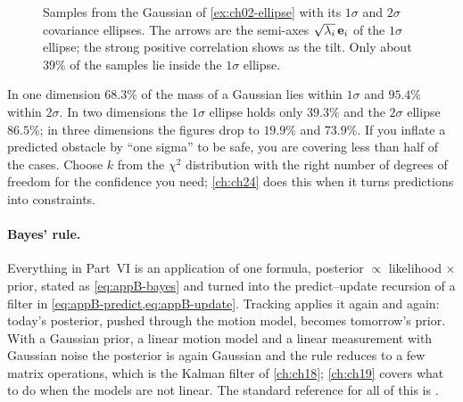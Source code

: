 
\begin{figure}[tb]
  \centering
  \caption{Samples from the Gaussian of \cref{ex:ch02-ellipse} with its $1\sigma$ and $2\sigma$ covariance ellipses. The arrows are the semi-axes $\sqrt{\lambda_i}\,\mathbf{e}_i$ of the $1\sigma$ ellipse; the strong positive correlation shows as the tilt. Only about $39\%$ of the samples lie inside the $1\sigma$ ellipse.}
  \label{fig:ch02-gaussian}
\end{figure}

\begin{pitfall}
In one dimension $68.3\%$ of the mass of a Gaussian lies within $1\sigma$ and $95.4\%$ within $2\sigma$. In two dimensions the $1\sigma$ ellipse holds only $39.3\%$ and the $2\sigma$ ellipse $86.5\%$; in three dimensions the figures drop to $19.9\%$ and $73.9\%$. If you inflate a predicted obstacle by ``one sigma'' to be safe, you are covering less than half of the cases. Choose $k$ from the $\chi^2$ distribution with the right number of degrees of freedom for the confidence you need; \cref{ch:ch24} does this when it turns predictions into constraints.
\end{pitfall}

\paragraph{Bayes' rule.}
Everything in Part~VI is an application of one formula, posterior $\propto$ likelihood $\times$ prior, stated as \cref{eq:appB-bayes} and turned into the predict--update recursion of a filter in \cref{eq:appB-predict,eq:appB-update}. Tracking applies it again and again: today's posterior, pushed through the motion model, becomes tomorrow's prior. With a Gaussian prior, a linear motion model and a linear measurement with Gaussian noise the posterior is again Gaussian and the rule reduces to a few matrix operations, which is the Kalman filter of \cref{ch:ch18}; \cref{ch:ch19} covers what to do when the models are not linear. The standard reference for all of this is \textcite{thrun2005probabilistic}.

